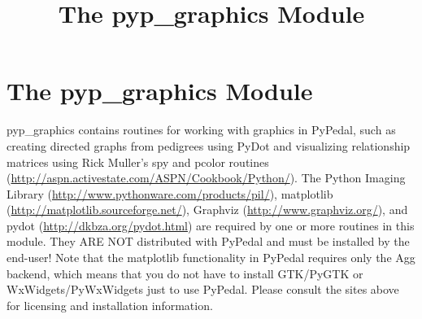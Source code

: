 \documentclass[10pt]{article}
\title{The pyp\_graphics Module}
\begin{document}
\section*{The pyp\_graphics Module}


 pyp\_graphics contains routines for working with graphics in PyPedal, such as creating directed graphs from pedigrees using PyDot and visualizing relationship matrices using Rick Muller's spy and pcolor routines (\url{http://aspn.activestate.com/ASPN/Cookbook/Python/}). The Python Imaging Library (\url{http://www.pythonware.com/products/pil/}), matplotlib (\url{http://matplotlib.sourceforge.net/}), Graphviz (\url{http://www.graphviz.org/}), and pydot (\url{http://dkbza.org/pydot.html}) are required by one or more routines in this module. They ARE NOT distributed with PyPedal and must be installed by the end-user! Note that the matplotlib functionality in PyPedal requires only the Agg backend, which means that you do not have to install GTK/PyGTK or WxWidgets/PyWxWidgets just to use PyPedal. Please consult the sites above for licensing and installation information.
\end{document}
